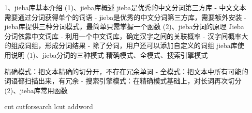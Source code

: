 \documentclass[main.tex]{subfiles}
\begin{document}
	
1、jieba库基本介绍
(1)、jieba库概述
jieba是优秀的中文分词第三方库
- 中文文本需要通过分词获得单个的词语
- jieba是优秀的中文分词第三方库，需要额外安装
- jieba库提供三种分词模式，最简单只需掌握一个函数
(2)、jieba分词的原理
Jieba分词依靠中文词库
- 利用一个中文词库，确定汉字之间的关联概率
- 汉字间概率大的组成词组，形成分词结果
- 除了分词，用户还可以添加自定义的词组
jieba库使用说明
(1)、jieba分词的三种模式
精确模式、全模式、搜索引擎模式

精确模式：把文本精确的切分开，不存在冗余单词
- 全模式：把文本中所有可能的词语都扫描出来，有冗余
- 搜索引擎模式：在精确模式基础上，对长词再次切分
(2)、jieba库常用函数

cut
cutforsearch
lcut
addword
\end{document}
